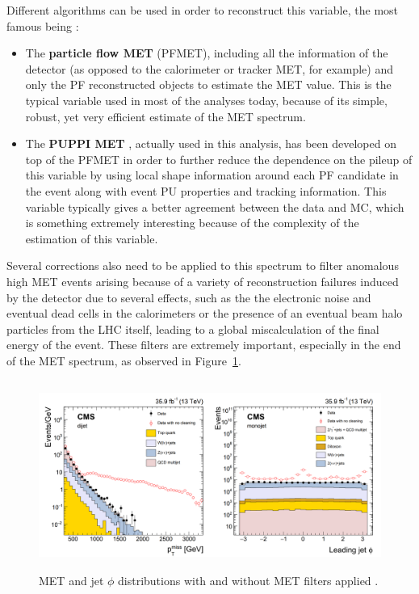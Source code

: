 \documentclass[a4paper, 10pt, openright]{report}
\begin{document}
Different algorithms can be used in order to reconstruct this variable, the most famous being \cite{METReco}:
\begin{itemize}
\item The \textbf{particle flow \ac{MET}} (PFMET), including all the information of the detector (as opposed to the calorimeter or tracker \ac{MET}, for example) and only the \ac{PF} reconstructed objects to estimate the \ac{MET} value. This is the typical variable used in most of the analyses today, because of its simple, robust, yet very efficient estimate of the \ac{MET} spectrum.
\item The \textbf{\ac{PUPPI} \ac{MET}} \cite{PUPPI}, actually used in this analysis, has been developed on top of the PFMET in order to further reduce the dependence on the pileup of this variable by using local shape information around each \ac{PF} candidate in the event along with event \ac{PU} properties and tracking information. This variable typically gives a better agreement between the data and \ac{MC}, which is something extremely interesting because of the complexity of the estimation of this variable.
\end{itemize}

Several corrections also need to be applied to this spectrum to filter anomalous high \ac{MET} events arising because of a variety of reconstruction failures induced by the detector due to several effects, such as the the electronic noise and eventual dead cells in the calorimeters or the presence of an eventual beam halo particles from the \ac{LHC} itself, leading to a global miscalculation of the final energy of the event. These filters are extremely important, especially in the end of the \ac{MET} spectrum, as observed in Figure~\ref{fig:METFilters}.

\begin{figure}[htbp]
\begin{center}
\includegraphics[width=14cm, height=6.2cm]{figs/METFilters.png}
\caption{\ac{MET} and jet $\phi$ distributions with and without \ac{MET} filters applied \cite{METReco}.}
\label{fig:METFilters}
\end{center}
\end{figure}
\end{document}
